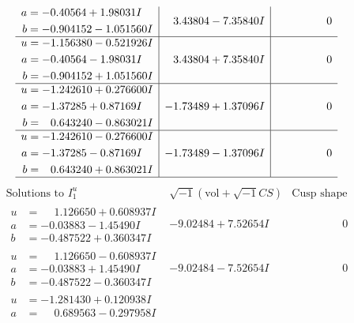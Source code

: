 \documentclass[1p]{elsarticle_modified}
\theoremstyle{definition}
\newcommand{\I}{\sqrt{-1}}
\begin{document}
$$\begin{array}{c|c|c}
\begin{aligned}
a &= -0.40564 + 1.98031 I \\
b &= -0.904152 - 1.051560 I\end{aligned}
 & \phantom{-}3.43804 - 7.35840 I & \phantom{-0.000000 } 0 \\ \hline\begin{aligned}
u &= -1.156380 - 0.521926 I \\
a &= -0.40564 - 1.98031 I \\
b &= -0.904152 + 1.051560 I\end{aligned}
 & \phantom{-}3.43804 + 7.35840 I & \phantom{-0.000000 } 0 \\ \hline\begin{aligned}
u &= -1.242610 + 0.276600 I \\
a &= -1.37285 + 0.87169 I \\
b &= \phantom{-}0.643240 - 0.863021 I\end{aligned}
 & -1.73489 + 1.37096 I & \phantom{-0.000000 } 0 \\ \hline\begin{aligned}
u &= -1.242610 - 0.276600 I \\
a &= -1.37285 - 0.87169 I \\
b &= \phantom{-}0.643240 + 0.863021 I\end{aligned}
 & -1.73489 - 1.37096 I & \phantom{-0.000000 } 0\\
 \hline 
 \end{array}$$\newpage$$\begin{array}{c|c|c}  
\text{Solutions to }I^u_{1}& \I (\text{vol} + \sqrt{-1}CS) & \text{Cusp shape}\\
 \hline 
\begin{aligned}
u &= \phantom{-}1.126650 + 0.608937 I \\
a &= -0.03883 - 1.45490 I \\
b &= -0.487522 + 0.360347 I\end{aligned}
 & -9.02484 + 7.52654 I & \phantom{-0.000000 } 0 \\ \hline\begin{aligned}
u &= \phantom{-}1.126650 - 0.608937 I \\
a &= -0.03883 + 1.45490 I \\
b &= -0.487522 - 0.360347 I\end{aligned}
 & -9.02484 - 7.52654 I & \phantom{-0.000000 } 0 \\ \hline\begin{aligned}
u &= -1.281430 + 0.120938 I \\
a &= \phantom{-}0.689563 - 0.297958 I \\

\end{aligned}
\end{array}$$
\end{document}
